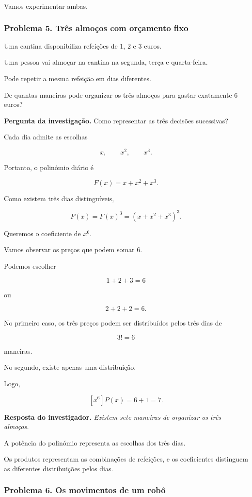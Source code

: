 \documentclass[11pt,a4paper,oneside]{book}
\newcommand{\Pergunta}[1]{\begin{perguntabox}\textbf{Pergunta da investigação.} #1\end{perguntabox}}
\newcommand{\Resposta}[1]{\textcolor{verdeescuro}{\textbf{Resposta do investigador.}} \emph{#1}\par}
\begin{document}
Vamos experimentar ambas.

\subsubsection*{Problema 5. Três almoços com orçamento fixo}

Uma cantina disponibiliza refeições
de $1$, $2$ e $3$ euros.

Uma pessoa vai almoçar na cantina
na segunda, terça e quarta-feira.

Pode repetir a mesma refeição
em dias diferentes.

De quantas maneiras pode organizar
os três almoços para gastar
exatamente $6$ euros?

\Pergunta{Como representar as três
decisões sucessivas?}

Cada dia admite as escolhas

\[
x,\qquad x^2,\qquad x^3.
\]

Portanto, o polinómio diário é

\[
F(x)=x+x^2+x^3.
\]

Como existem três dias distinguíveis,

\[
P(x)=F(x)^3=(x+x^2+x^3)^3.
\]

Queremos o coeficiente de $x^6$.

Vamos observar os preços que podem
somar $6$.

Podemos escolher

\[
1+2+3=6
\]

ou

\[
2+2+2=6.
\]

No primeiro caso, os três preços
podem ser distribuídos pelos
três dias de

\[
3!=6
\]

maneiras.

No segundo, existe apenas
uma distribuição.

Logo,

\[
[x^6]P(x)=6+1=\boxed{7}.
\]

\Resposta{Existem sete maneiras
de organizar os três almoços.}

A potência do polinómio representa
as escolhas dos três dias.

Os produtos representam as
combinações de refeições,
e os coeficientes distinguem
as diferentes distribuições pelos dias.

\subsubsection*{Problema 6. Os movimentos de um robô}
\end{document}
